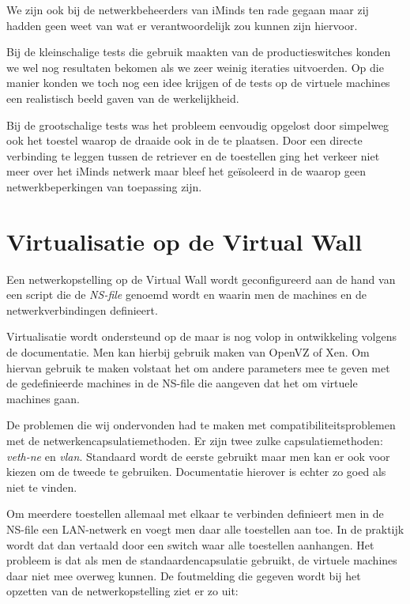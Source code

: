 We zijn ook bij de netwerkbeheerders van iMinds ten rade gegaan maar zij hadden geen weet van wat er verantwoordelijk zou kunnen zijn hiervoor.

Bij de kleinschalige tests die gebruik maakten van de productieswitches konden we wel nog resultaten bekomen als we zeer weinig iteraties uitvoerden.
Op die manier konden we toch nog een idee krijgen of de tests op de virtuele machines een realistisch beeld gaven van de werkelijkheid.

Bij de grootschalige tests was het probleem eenvoudig opgelost door simpelweg ook het toestel waarop de \nwmretriever{} draaide ook in de \vwall{} te plaatsen.
Door een directe verbinding te leggen tussen de retriever en de toestellen ging het verkeer niet meer over het iMinds netwerk maar bleef het geïsoleerd in de \vwall{} waarop geen netwerkbeperkingen van toepassing zijn.


\section{Virtualisatie op de Virtual Wall}
\label{probleem-virtualisatie-vwall}

Een netwerkopstelling op de Virtual Wall wordt geconfigureerd aan de hand van een script die de \textit{NS-file} genoemd wordt en
waarin men de machines en de netwerkverbindingen definieert.

Virtualisatie wordt ondersteund op de \vwall{} maar is nog volop in ontwikkeling volgens de documentatie.
Men kan hierbij gebruik maken van OpenVZ of Xen\cite{vwall-openvz, vwall-xen}.
Om hiervan gebruik te maken volstaat het om andere parameters mee te geven met de gedefinieerde machines in de NS-file die aangeven dat het om virtuele machines gaan.

De problemen die wij ondervonden had te maken met compatibiliteitsproblemen met de netwerkencapsulatiemethoden.
Er zijn twee zulke capsulatiemethoden: \textit{veth-ne} en \textit{vlan}.
Standaard wordt de eerste gebruikt maar men kan er ook voor kiezen om de tweede te gebruiken.
Documentatie hierover is echter zo goed als niet te vinden.

Om meerdere toestellen allemaal met elkaar te verbinden definieert men in de NS-file een LAN-netwerk en voegt men daar alle toestellen aan toe.
In de praktijk wordt dat dan vertaald door een switch waar alle toestellen aanhangen.
Het probleem is dat als men de standaardencapsulatie gebruikt, de virtuele machines daar niet mee overweg kunnen.
De foutmelding die gegeven wordt bij het opzetten van de netwerkopstelling ziet er zo uit:

